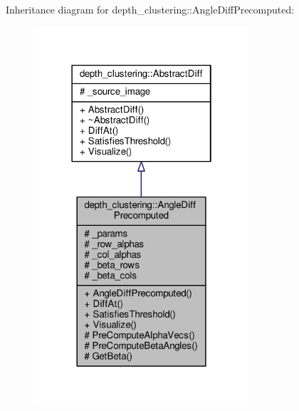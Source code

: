 Inheritance diagram for depth\-\_\-clustering\-:\-:Angle\-Diff\-Precomputed\-:
\nopagebreak
\begin{figure}[H]
\begin{center}
\leavevmode
\includegraphics[width=226pt]{classdepth__clustering_1_1AngleDiffPrecomputed__inherit__graph}
\end{center}
\end{figure}


